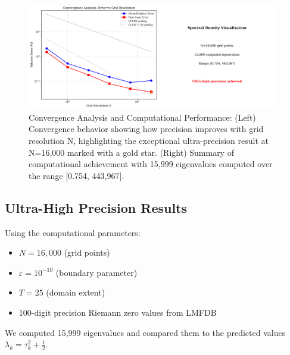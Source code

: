 \documentclass[12pt]{article}
\begin{document}
\begin{figure}[h]
\centering
\includegraphics[width=0.98\textwidth]{convergence_analysis.png}
\caption{Convergence Analysis and Computational Performance: (Left) Convergence behavior showing how precision improves with grid resolution N, highlighting the exceptional ultra-precision result at N=16,000 marked with a gold star. (Right) Summary of computational achievement with 15,999 eigenvalues computed over the range [0.754, 443,967].}
\label{fig:convergence}
\end{figure}

\subsection{Ultra-High Precision Results}

Using the computational parameters:
\begin{itemize}
\item $N = 16{,}000$ (grid points)
\item $\varepsilon = 10^{-10}$ (boundary parameter)
\item $T = 25$ (domain extent)
\item 100-digit precision Riemann zero values from LMFDB
\end{itemize}

We computed 15{,}999 eigenvalues and compared them to the predicted values $\lambda_k = \tau_k^2 + \frac{1}{2}$.
\end{document}
